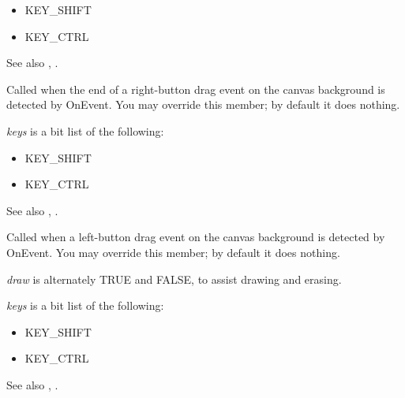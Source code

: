 \begin{itemize}\itemsep=0pt
\item KEY\_SHIFT
\item KEY\_CTRL
\end{itemize}

See also , .

\label{wxshapecanvasonenddragright}


Called when the end of a right-button drag event on the canvas background is detected by OnEvent. You may override this member;
by default it does nothing.

{\it keys} is a bit list of the following:

\begin{itemize}\itemsep=0pt
\item KEY\_SHIFT
\item KEY\_CTRL
\end{itemize}

See also , .

\label{wxshapecanvasondragleft}


Called when a left-button drag event on the canvas background is detected by OnEvent. You may override this member;
by default it does nothing.

{\it draw} is alternately TRUE and FALSE, to assist drawing and erasing.

{\it keys} is a bit list of the following:

\begin{itemize}\itemsep=0pt
\item KEY\_SHIFT
\item KEY\_CTRL
\end{itemize}

See also , .

\label{wxshapecanvasondragright}

